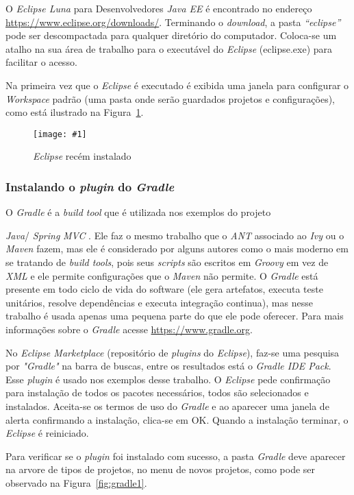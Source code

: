 \documentclass[a4paper,12pt]{article}
\newcommand{\spring} {
\lang{Java}/\est{Spring} \sigla{MVC}
}
\newcommand{\figura}[3] {
	\begin{figure}[ht]
		\centering
		\texttt{[image: \#1]}
		\caption{#2}
		\label{#3}
	\end{figure}
	\FloatBarrier
}
\newcommand{\est}[1] {
\textit{#1}}
\newcommand{\sigla}[1] {
\textit{#1}}
\newcommand{\lang}[1] {
\textit{#1}}
\begin{document}
O \est{Eclipse Luna} para Desenvolvedores \est{Java EE} é encontrado no endereço \url{https://www.eclipse.org/downloads/}. Terminando o \est{download}, a pasta \est{“eclipse”} pode ser descompactada para qualquer diretório do computador. Coloca-se um atalho na sua área de trabalho para o executável do \est{Eclipse} (eclipse.exe) para facilitar o acesso.

Na primeira vez que o \est{Eclipse} é executado é exibida uma janela para configurar o \est{Workspace} padrão (uma pasta onde serão guardados projetos e configurações), como está ilustrado na Figura~\ref{fig:eclipse1}.

\figura{eclipse1.png}{\est{Eclipse} recém instalado}{fig:eclipse1}

\subsubsection{Instalando o \est{plugin} do \est{Gradle}} 

O \est{Gradle} é a \est{build tool} que é utilizada nos exemplos do projeto \spring. Ele faz o mesmo trabalho que o \est{ANT} associado ao \est{Ivy} ou o \est{Maven} fazem, mas ele é considerado por alguns autores como o mais moderno em se tratando de \est{build tools}, pois seus \est{scripts} são escritos em \lang{Groovy} em vez de \sigla{XML} e ele permite configurações que o \est{Maven} não permite. O \est{Gradle} está presente em todo ciclo de vida do software (ele gera artefatos, executa teste unitários, resolve dependências e executa integração continua), mas nesse trabalho é usada apenas uma pequena parte do que ele pode oferecer. Para mais informações sobre o \est{Gradle} acesse \url{https://www.gradle.org}. 

No \est{Eclipse Marketplace} (repositório de \est{plugins} do \est{Eclipse}), faz-se uma pesquisa por \est{"Gradle"} na barra de buscas, entre os resultados está o \est{Gradle IDE Pack}. Esse \est{plugin} é usado nos exemplos desse trabalho. O \est{Eclipse} pede confirmação para instalação de todos os pacotes necessários, todos são selecionados e instalados. Aceita-se os termos de uso do \est{Gradle} e ao aparecer uma janela de alerta confirmando a instalação, clica-se em OK. Quando a instalação terminar, o \est{Eclipse} é reiniciado.

Para verificar se o \est{plugin} foi instalado com sucesso, a pasta \est{Gradle} deve aparecer na arvore de tipos de projetos, no menu de novos projetos, como pode ser observado na Figura~\ref{fig:gradle1}.
\end{document}
